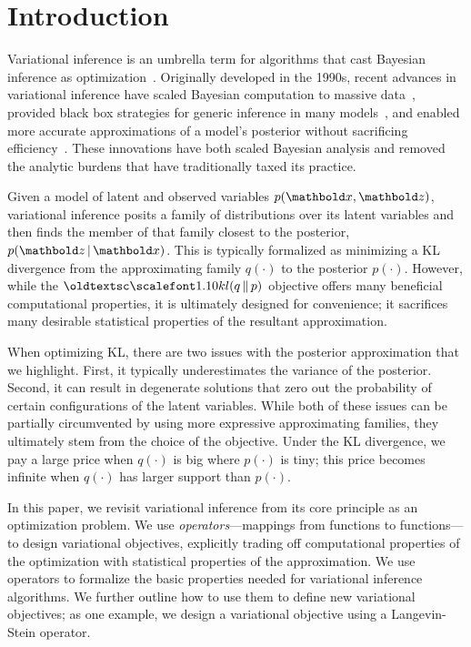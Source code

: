 
\section{Introduction}
\label{sec:introduction}




Variational inference is an umbrella term for algorithms that cast
Bayesian inference as optimization~\citep{Jordan:1999}.  Originally
developed in the 1990s, recent advances in variational inference have
scaled Bayesian computation to massive
data~\citep{Hoffman:2013}, provided black box strategies
for generic inference in many models~\citep{Ranganath:2014}, and
enabled more accurate approximations of a model's posterior without
sacrificing efficiency~\citep{Rezende:2015,
  ranganath2016hierarchical}.  These innovations have both scaled
Bayesian analysis and removed the analytic burdens that have
traditionally taxed its practice.

Given a model of latent and observed variables $p(\mbx, \mbz)$, variational
inference posits a family of distributions over its latent variables
and then finds the member of that family closest to the posterior,
$p(\mbz \g \mbx)$. This is typically formalized as minimizing a \gls{KL}
divergence from the approximating family $q(\cdot)$ to the posterior
$p(\cdot)$.  However, while the $\textsc{kl}(q \gg p)$ objective offers
many beneficial computational properties, it is ultimately designed
for convenience; it sacrifices many desirable statistical properties
of the resultant approximation.

When optimizing \gls{KL}, there are two issues with the posterior
approximation that we highlight.  First, it typically underestimates the
variance of the posterior.  Second, it can result in degenerate
solutions that zero out the probability of certain configurations of
the latent variables.  While both of these issues can be partially
circumvented by using more expressive approximating families, they
ultimately stem from the choice of the objective. Under the \gls{KL}
divergence, we pay a large price when $q(\cdot)$ is
big where $p(\cdot)$ is tiny; this price becomes infinite when $q(\cdot)$ has
larger support than $p(\cdot)$.



In this paper, we revisit variational inference from its core
principle as an optimization problem. We use
\textit{operators}---mappings from functions to functions---to design
variational objectives, explicitly trading off computational
properties of the optimization with statistical properties of the
approximation.  We
use operators to formalize the basic properties
needed for variational inference algorithms. We
further outline how to use them to define new
variational objectives; as one example, we
design a variational objective using a Langevin-Stein operator.

